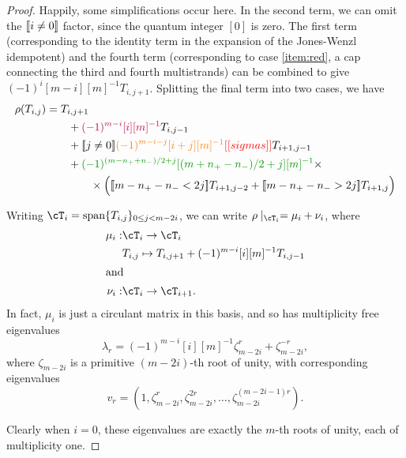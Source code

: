 \documentclass[12pt]{article}
\begin{document}
\begin{proof}
Happily, some simplifications occur here. In the second term, we can omit the $[\![ i\neq0 ]\!]$ factor, since the quantum integer $[0]$ is zero. The first term (corresponding to the identity term in the expansion of the Jones-Wenzl idempotent) and the fourth term (corresponding to case \eqref{item:red}, a cap connecting the third and fourth multistrands) can be combined to give $(-1)^i [m-i][m]^{-1} T_{i,j+1}$. Splitting the final term into two cases, we have
\begin{align*}
\rho(T_{i,j}) & =
T_{i, j + 1} \\
& \qquad +
\textcolor{purple}{(-1)^{m-i} [i][m]^{-1}} T_{i,j-1} \\
& \qquad +
\truth{j \neq 0}\textcolor{orange}{(-1)^{m-i-j} [i+j][m]^{-1}} \nn{sigmas} T_{i+1, j-1} \\
& \qquad +
\textcolor{DarkGreen}{(-1)^{(m - n_+ + n_-)/2 + j} [(m + n_+ - n_-)/2 + j][m]^{-1}} \times \\
& \qquad \qquad \times \Big(
\truth{m-n_+-n_- < 2j}  T_{i+1,j-2} + \truth{m-n_+-n_- > 2j} T_{i+1,j}
\Big)
\end{align*}



Writing $\cT_i = \Span \{ T_{i,j} \}_{0 \leq j < m- 2i}$, we can write $\rho \mid_{\cT_i} = \mu_i + \nu_i$, where
\begin{align*}
\mu_i : & \cT_i \to \cT_i \\
 & T_{i,j} \mapsto T_{i,j+1} + (-1)^{m-i}[i][m]^{-1} T_{i,j-1} \\
\intertext{and}
\nu_i : & \cT_i \to \cT_{i+1}.
\end{align*}
In fact, $\mu_i$ is just a circulant matrix in this basis, and so has multiplicity free eigenvalues
$$\lambda_r = (-1)^{m-i}[i][m]^{-1} \zeta_{m-2i}^r + \zeta_{m-2i}^{-r},$$
where $\zeta_{m-2i}$ is a primitive $(m-2i)$-th root of unity, with corresponding eigenvalues
$$v_r = \left(1, \zeta_{m-2i}^r , \zeta_{m-2i}^{2r} , \ldots, \zeta_{m-2i}^{(m-2i-1)r} \right).$$

Clearly when $i = 0$, these eigenvalues are exactly the $m$-th roots of unity, each of multiplicity one.



\end{proof}
\end{document}

